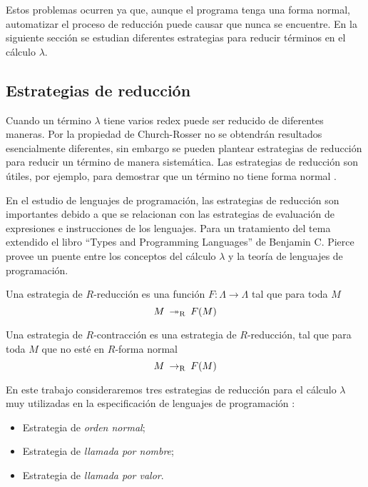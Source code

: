 Estos problemas ocurren ya que, aunque el programa tenga una forma normal, automatizar el proceso de reducción puede causar que nunca se encuentre. En la siguiente sección se estudian diferentes estrategias para reducir términos en el cálculo $ λ $.

\subsection{Estrategias de reducción}
\label{sec:estrategias-reduccion}

Cuando un término $ λ $ tiene varios redex puede ser reducido de diferentes maneras. Por la propiedad de Church-Rosser no se obtendrán resultados esencialmente diferentes, sin embargo se pueden plantear estrategias de reducción para reducir un término de manera sistemática. Las estrategias de reducción son útiles, por ejemplo, para demostrar que un término no tiene forma normal \cite[p.~324]{Barendregt:Bible}.

En el estudio de lenguajes de programación, las estrategias de reducción son importantes debido a que se relacionan con las estrategias de evaluación de expresiones e instrucciones de los lenguajes. Para un tratamiento del tema extendido el libro ``Types and Programming Languages'' de Benjamin C. Pierce \cite{Pierce:TypesAndPLangs} provee un puente entre los conceptos del cálculo $ λ $ y la teoría de lenguajes de programación.

\begin{defn}
  Una estrategia de $ R $-reducción es una función $ F \colon Λ \to Λ $ tal que para toda $ M $
  \[ M \ \operatorname{\twoheadrightarrow_{R}}\  F(M) \]

  Una estrategia de $ R $-contracción es una estrategia de $ R $-reducción, tal que para toda $ M $ que no esté en $ R $-forma normal
  \[ M \ \operatorname{\rightarrow_{R}}\  F(M) \]
\end{defn}

En este trabajo consideraremos tres estrategias de reducción para el cálculo $ λ $ muy utilizadas en la especificación de lenguajes de programación \cite{Pierce:TypesAndPLangs}:

\begin{itemize}
\item Estrategia de \emph{orden normal};
\item Estrategia de \emph{llamada por nombre};
\item Estrategia de \emph{llamada por valor}.
\end{itemize}


